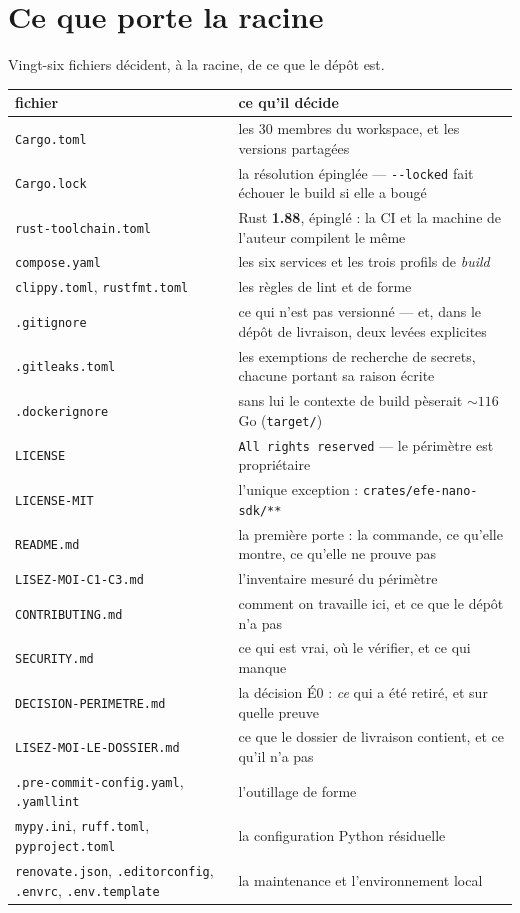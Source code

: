 \documentclass[10pt]{report}
\newcommand{\code}[1]{\texttt{\small #1}}
\begin{document}
\section{Ce que porte la racine}

Vingt-six fichiers décident, à la racine, de ce que le dépôt est.

\begin{longtable}{@{}p{4.0cm}p{11.0cm}@{}}
\toprule \textbf{fichier} & \textbf{ce qu'il décide} \\ \midrule \endhead
\code{Cargo.toml} & les 30 membres du workspace, et les versions partagées \\
\code{Cargo.lock} & la résolution épinglée --- \code{-{}-locked} fait échouer le build si elle a bougé \\
\code{rust-toolchain.toml} & Rust \textbf{1.88}, épinglé : la CI et la machine de l'auteur compilent le même \\
\code{compose.yaml} & les six services et les trois profils de \emph{build} \\
\code{clippy.toml}, \code{rustfmt.toml} & les règles de lint et de forme \\
\code{.gitignore} & ce qui n'est pas versionné --- et, dans le dépôt de livraison, deux levées explicites \\
\code{.gitleaks.toml} & les exemptions de recherche de secrets, chacune portant sa raison écrite \\
\code{.dockerignore} & sans lui le contexte de build pèserait ${\sim}116$\,Go (\code{target/}) \\
\code{LICENSE} & \code{All rights reserved} --- le périmètre est propriétaire \\
\code{LICENSE-MIT} & l'unique exception : \code{crates/efe-nano-sdk/**} \\
\code{README.md} & la première porte : la commande, ce qu'elle montre, ce qu'elle ne prouve pas \\
\code{LISEZ-MOI-C1-C3.md} & l'inventaire mesuré du périmètre \\
\code{CONTRIBUTING.md} & comment on travaille ici, et ce que le dépôt n'a pas \\
\code{SECURITY.md} & ce qui est vrai, où le vérifier, et ce qui manque \\
\code{DECISION-PERIMETRE.md} & la décision É0 : \emph{ce} qui a été retiré, et sur quelle preuve \\
\code{LISEZ-MOI-LE-DOSSIER.md} & ce que le dossier de livraison contient, et ce qu'il n'a pas \\
\code{.pre-commit-config.yaml}, \code{.yamllint} & l'outillage de forme \\
\code{mypy.ini}, \code{ruff.toml}, \code{pyproject.toml} & la configuration Python résiduelle \\
\code{renovate.json}, \code{.editorconfig}, \code{.envrc}, \code{.env.template} & la maintenance et l'environnement local \\
\bottomrule
\end{longtable}
\end{document}
